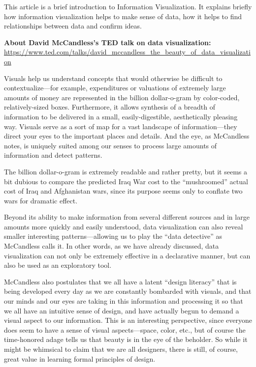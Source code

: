 \documentclass[]{book}
\theoremstyle{definition}
\theoremstyle{definition}
\theoremstyle{definition}
\theoremstyle{remark}
\begin{document}
This article is a brief introduction to Information Visualization. It
explains briefly how information visualization helps to make sense of
data, how it helps to find relationships between data and confirm ideas.

\textbf{About David McCandless's TED talk on data visualization:}
\url{https://www.ted.com/talks/david_mccandless_the_beauty_of_data_visualization}

Visuals help us understand concepts that would otherwise be difficult to
contextualize---for example, expenditures or valuations of extremely
large amounts of money are represented in the billion dollar-o-gram by
color-coded, relatively-sized boxes. Furthermore, it allows synthesis of
a breadth of information to be delivered in a small, easily-digestible,
aesthetically pleasing way. Visuals serve as a sort of map for a vast
landscape of information---they direct your eyes to the important places
and details. And the eye, as McCandless notes, is uniquely suited among
our senses to process large amounts of information and detect patterns.

The billion dollar-o-gram is extremely readable and rather pretty, but
it seems a bit dubious to compare the predicted Iraq War cost to the
``mushroomed'' actual cost of Iraq and Afghanistan wars, since its
purpose seems only to conflate two wars for dramatic effect.

Beyond its ability to make information from several different sources
and in large amounts more quickly and easily understood, data
visualization can also reveal smaller interesting patterns---allowing us
to play the ``data detective'' as McCandless calls it. In other words,
as we have already discussed, data visualization can not only be
extremely effective in a declarative manner, but can also be used as an
exploratory tool.

McCandless also postulates that we all have a latent ``design literacy''
that is being developed every day as we are constantly bombarded with
visuals, and that our minds and our eyes are taking in this information
and processing it so that we all have an intuitive sense of design, and
have actually begun to demand a visual aspect to our information. This
is an interesting perspective, since everyone does seem to have a sense
of visual aspects---space, color, etc., but of course the time-honored
adage tells us that beauty is in the eye of the beholder. So while it
might be whimsical to claim that we are all designers, there is still,
of course, great value in learning formal principles of design.
\end{document}
